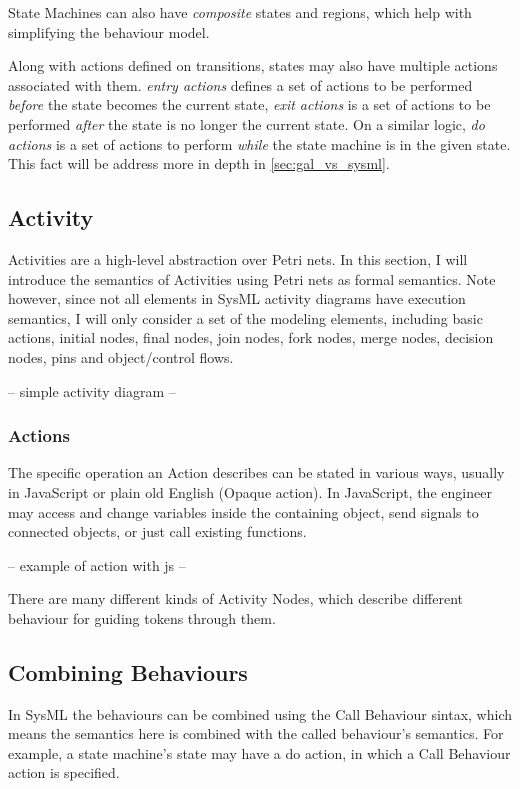 State Machines can also have \emph{composite} states and regions, which help with simplifying the behaviour model.

Along with actions defined on transitions, states may also have multiple actions associated with them. \emph{entry actions} defines a set of actions to be performed \emph{before} the state becomes the current state, \emph{exit actions} is a set of actions to be performed \emph{after} the state is no longer the current state. On a similar logic, \emph{do actions} is a set of actions to perform \emph{while} the state machine is in the given state. This fact will be address more in depth in \autoref{sec:gal_vs_sysml}. 

\subsection{Activity}

Activities are a high-level abstraction over Petri nets. In this section, I will introduce the semantics of Activities using Petri nets as formal semantics. Note however, since not all elements in SysML activity diagrams have execution semantics, I will only consider a set of the modeling elements, including basic actions, initial nodes, final nodes, join nodes, fork nodes, merge nodes, decision nodes, pins and object/control flows.\cite{fuml}\cite{https://doi.org/10.1002/sys.21524}

-- simple activity diagram --

\subsubsection*{Actions}

The specific operation an Action describes can be stated in various ways, usually in JavaScript or plain old English (Opaque action). In JavaScript, the engineer may access and change variables inside the containing object, send signals to connected objects, or just call existing functions.

-- example of action with js --

There are many different kinds of Activity Nodes, which describe different behaviour for guiding tokens through them.

\subsection{Combining Behaviours}

In SysML the behaviours can be combined using the Call Behaviour sintax, which means the semantics here is combined with the called behaviour's semantics. For example, a state machine's state may have a do action, in which a Call Behaviour action is specified. 